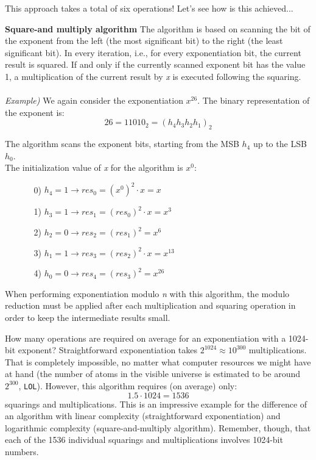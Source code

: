 \documentclass[11pt, a4paper]{article}
\begin{document}
This approach takes a total of six operations! Let's see how is this achieved...
\begin{framed}
    \hfill\break\textbf{Square-and multiply algorithm} The algorithm is based on scanning the bit of the exponent from the left (the most significant bit) to the right (the least significant bit). In every iteration, i.e., for every exponentiation bit, the current result is squared. If and only if the currently scanned exponent bit has the value 1, a multiplication of the current result by \textit{x} is executed following the squaring.\\\\
\textit{Example)} We again consider the exponentiation $x^{26}$. The binary representation of the exponent \nolinebreak is:
$$26=11010_2=(h_4h_3h_2h_1)_2$$

The algorithm scans the exponent bits, starting from the MSB $h_4$ up to the LSB $h_0$.\\

The initialization value of \textit{x} for the algorithm is $x^0$:
\begin{itemize}
    \item[]\begin{enumerate}
        \item[0)] $h_4=1\rightarrow res_0=(x^0)^2\cdot x=x$
        \item[1)] $h_3=1\rightarrow res_1=(res_0)^2\cdot x = x^3$
        \item[2)] $h_2=0\rightarrow res_2=(res_1)^2=x^6$
        \item[3)] $h_1=1\rightarrow res_3=(res_2)^2\cdot x=x^{13}$
        \item[4)] $h_0=0\rightarrow res_4=(res_3)^2=x^{26}$
    \end{enumerate}
\end{itemize}
When performing exponentiation modulo \textit{n} with this algorithm, the modulo reduction must be applied after each multiplication and squaring operation in order to keep the intermediate results small.
\end{framed}
How many operations are required on average for an exponentiation with a 1024-bit exponent? Straightforward exponentiation takes $2^{1024}\approx10^{300}$ multiplications. That is completely impossible, no matter what computer resources we might have at hand  (the number of atoms in the visible universe is estimated to be around $2^{300}$, \texttt{LOL}). However, this algorithm requires (on average) only:
$$1.5\cdot1024=1536$$
squarings and multiplications. This is an impressive example for the difference of an algorithm with linear complexity (straightforward exponentiation) and logarithmic complexity (square-and-multiply algorithm). Remember, though, that each of the 1536 individual squarings and multiplications involves 1024-bit numbers.
\end{document}
